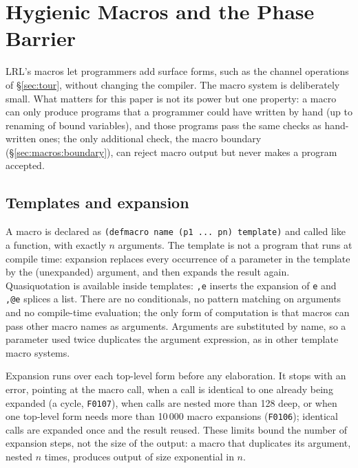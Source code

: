\section{Hygienic Macros and the Phase Barrier}\label{sec:macros}

LRL's macros let programmers add surface forms, such as the channel operations of \S\ref{sec:tour}, without changing the compiler.
The macro system is deliberately small.
What matters for this paper is not its power but one property: a macro can only produce programs that a programmer could have written by hand (up to renaming of bound variables), and those programs pass the same checks as hand-written ones; the only additional check, the macro boundary (\S\ref{sec:macros:boundary}), can reject macro output but never makes a program accepted.

\subsection{Templates and expansion}\label{sec:macros:alg}

A macro is declared as \lstinline|(defmacro name (p1 ... pn) template)| and called like a function, with exactly $n$ arguments.
The template is not a program that runs at compile time: expansion replaces every occurrence of a parameter in the template by the (unexpanded) argument, and then expands the result again.
Quasiquotation is available inside templates: \lstinline|,e| inserts the expansion of \lstinline|e| and \lstinline|,@e| splices a list.
There are no conditionals, no pattern matching on arguments and no compile-time evaluation; the only form of computation is that macros can pass other macro names as arguments.
Arguments are substituted by name, so a parameter used twice duplicates the argument expression, as in other template macro systems.

Expansion runs over each top-level form before any elaboration.
It stops with an error, pointing at the macro call, when a call is identical to one already being expanded (a cycle, \texttt{F0107}), when calls are nested more than 128 deep, or when one top-level form needs more than 10\,000 macro expansions (\texttt{F0106}); identical calls are expanded once and the result reused.
These limits bound the number of expansion steps, not the size of the output: a macro that duplicates its argument, nested $n$ times, produces output of size exponential in $n$.

